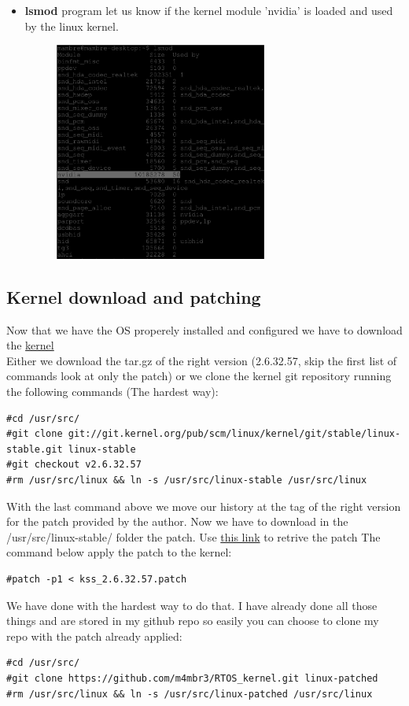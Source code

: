 \documentclass[a4paper,13pt]{article}
\begin{document}
\begin{multicols}{2}
\begin{itemize}
        \item{{\bf lsmod} program let us know if the kernel module 'nvidia' is loaded and used by the linux kernel.}
            \begin{figure}[H]
                \includegraphics[width=7cm]{eps/lsmod.eps}
            \end{figure}
    \end{itemize}

\subsection{Kernel download and patching \cite{kernel}}
    Now that we have the OS properely installed and configured we have to download the \href{www.kernel.org}{kernel}\\
    Either we download the tar.gz of  the right version (2.6.32.57, skip the first list of commands look at only the patch) or we clone the kernel git repository running the following commands (The hardest way):\\
    \begin{lstlisting}
#cd /usr/src/
#git clone git://git.kernel.org/pub/scm/linux/kernel/git/stable/linux-stable.git linux-stable
#git checkout v2.6.32.57
#rm /usr/src/linux && ln -s /usr/src/linux-stable /usr/src/linux
    \end{lstlisting}
    With the last command above we move our history at the tag of the right version for the patch provided 
    by the author.
    Now we have to download in the /usr/src/linux-stable/ folder the patch. Use \href{https://mega.co.nz/#!R09hlSrY!TjYiR2m4xV6hadBFEuXAQ2r1-TBUB4LIkAU7-0sgn58}{this link} to retrive the patch 
    The command below apply the patch to the kernel:
\begin{lstlisting}
#patch -p1 < kss_2.6.32.57.patch
\end{lstlisting}
    We have done with the hardest way to do that. I have already done all those things and are stored in my github repo
    so easily you can choose to clone my repo with the patch already applied:
\begin{lstlisting}
#cd /usr/src/
#git clone https://github.com/m4mbr3/RTOS_kernel.git linux-patched
#rm /usr/src/linux && ln -s /usr/src/linux-patched /usr/src/linux
\end{lstlisting}


\end{multicols}
\end{document}
